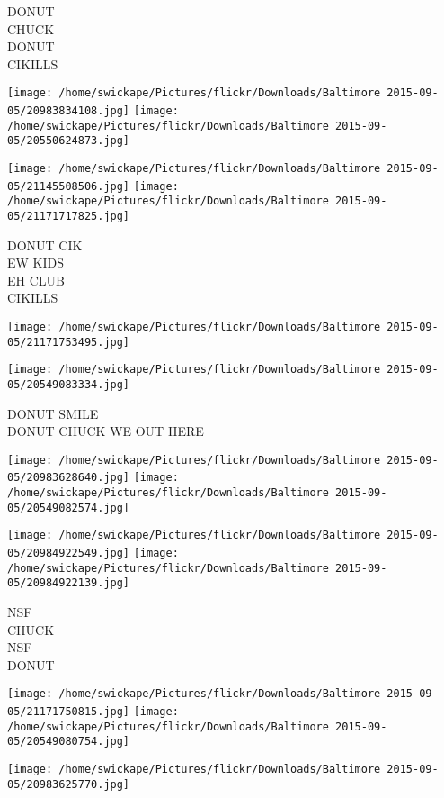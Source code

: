 \documentclass[10pt,letterpaper]{article}
\begin{document}
DONUT\\
CHUCK\\
DONUT\\
CIKILLS
\pagebreak

\texttt{[image: /home/swickape/Pictures/flickr/Downloads/Baltimore 2015-09-05/20983834108.jpg]}
\texttt{[image: /home/swickape/Pictures/flickr/Downloads/Baltimore 2015-09-05/20550624873.jpg]}

\texttt{[image: /home/swickape/Pictures/flickr/Downloads/Baltimore 2015-09-05/21145508506.jpg]}
\texttt{[image: /home/swickape/Pictures/flickr/Downloads/Baltimore 2015-09-05/21171717825.jpg]}

DONUT CIK\\
EW KIDS\\
EH CLUB\\
CIKILLS
\pagebreak

\texttt{[image: /home/swickape/Pictures/flickr/Downloads/Baltimore 2015-09-05/21171753495.jpg]}

\vspace{0.25in}
\texttt{[image: /home/swickape/Pictures/flickr/Downloads/Baltimore 2015-09-05/20549083334.jpg]}

DONUT SMILE\\
DONUT CHUCK WE OUT HERE
\pagebreak

\texttt{[image: /home/swickape/Pictures/flickr/Downloads/Baltimore 2015-09-05/20983628640.jpg]}
\texttt{[image: /home/swickape/Pictures/flickr/Downloads/Baltimore 2015-09-05/20549082574.jpg]}

\texttt{[image: /home/swickape/Pictures/flickr/Downloads/Baltimore 2015-09-05/20984922549.jpg]}
\texttt{[image: /home/swickape/Pictures/flickr/Downloads/Baltimore 2015-09-05/20984922139.jpg]}

NSF\\
CHUCK\\
NSF\\
DONUT
\pagebreak

\texttt{[image: /home/swickape/Pictures/flickr/Downloads/Baltimore 2015-09-05/21171750815.jpg]}
\texttt{[image: /home/swickape/Pictures/flickr/Downloads/Baltimore 2015-09-05/20549080754.jpg]}

\vspace{0.25in}
\texttt{[image: /home/swickape/Pictures/flickr/Downloads/Baltimore 2015-09-05/20983625770.jpg]}
\end{document}
